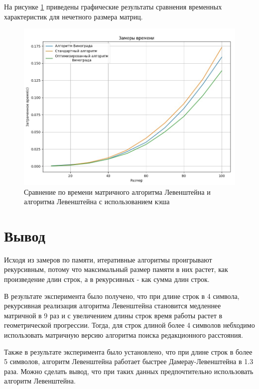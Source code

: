 На рисунке \ref{img:odd} приведены графические результаты сравнения временных характеристик для нечетного размера матриц.

\begin{figure}[H]
	\begin{center}
		\includegraphics[scale=0.5]{img/odd.jpg}
	\end{center}
	\captionsetup{justification=centering}
	\caption{Сравнение по времени матричного алгоритма Левенштейна и алгоритма Левенштейна с использованием кэша}
	\label{img:odd}
\end{figure}

\section{Вывод}

Исходя из замеров по памяти, итеративные алгоритмы проигрывают рекурсивным, потому что максимальный размер памяти в них растет, как произведение длин строк, а в рекурсивных - как сумма длин строк.

В результате эксперимента было получено, что при длине строк в 4 символа, рекурсивная реализация алгоритма Левенштейна становится медленнее матричной в 9 раз и с увеличением длины строк время работы растет в геометрической прогрессии. Тогда, для строк длиной более 4 символов небходимо использовать матричную версию алгоритма поиска редакционного расстояния.

Также в результате эксперимента было установлено, что при длине строк в более 5 символов, алгоритм Левенштейна работает быстрее Дамерау-Левенштейна в 1.3 раза. Можно сделать вывод, что при таких данных предпочтительно использовать алгоритм Левенштейна.